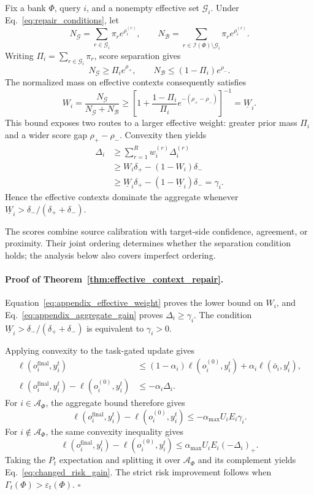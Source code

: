 Fix a bank $\Phi$, query $i$, and a nonempty effective set $\mathcal G_i$. Under
Eq.~\eqref{eq:repair_conditions}, let
\[
N_{\mathcal G}
=\sum_{r\in\mathcal G_i}\pi_r e^{\rho_i^{(r)}},
\qquad
N_{\mathcal B}
=\sum_{r\in\mathcal I(\Phi)\setminus\mathcal G_i}\pi_r e^{\rho_i^{(r)}}.
\]
Writing $\Pi_i=\sum_{r\in\mathcal G_i}\pi_r$, score separation gives
\[
N_{\mathcal G}\geq\Pi_i e^{\rho_+},
\qquad
N_{\mathcal B}\leq(1-\Pi_i)e^{\rho_-}.
\]
The normalized mass on effective contexts consequently satisfies
\begin{equation}
W_i
=\frac{N_{\mathcal G}}{N_{\mathcal G}+N_{\mathcal B}}
\geq
\left[1+\frac{1-\Pi_i}{\Pi_i}
e^{-(\rho_+-\rho_-)}\right]^{-1}
=\underline W_i.
\label{eq:appendix_effective_weight}
\end{equation}
This bound exposes two routes to a larger effective weight: greater prior
mass $\Pi_i$ and a wider score gap $\rho_+-\rho_-$.  Convexity then yields
\begin{equation}
\begin{aligned}
\Delta_i
&\geq\sum_{r=1}^{R} w_i^{(r)}\Delta_i^{(r)}\\
&\geq W_i\delta_+-(1-W_i)\delta_-\\
&\geq\underline W_i\delta_+-(1-\underline W_i)\delta_-
=\gamma_i.
\end{aligned}
\label{eq:appendix_aggregate_gain}
\end{equation}
Hence the effective contexts dominate the aggregate whenever
$\underline W_i>\delta_-/(\delta_++\delta_-)$.

The scores combine source calibration with target-side confidence, agreement,
or proximity.  Their joint ordering determines whether the separation
condition holds; the analysis below also covers imperfect ordering.

\paragraph{Proof of Theorem~\ref{thm:effective_context_repair}.}

Equation~\eqref{eq:appendix_effective_weight} proves the lower bound on
$W_i$, and Eq.~\eqref{eq:appendix_aggregate_gain} proves
$\Delta_i\geq\gamma_i$.  The condition
$\underline W_i>\delta_-/(\delta_++\delta_-)$ is equivalent to
$\gamma_i>0$.

Applying convexity to the task-gated update gives
\[
\begin{aligned}
\ell(o_i^{\mathrm{final}},y_i^t)
&\leq(1-\alpha_i)\ell(o_i^{(0)},y_i^t)
+\alpha_i\ell(\bar o_i,y_i^t),\\
\ell(o_i^{\mathrm{final}},y_i^t)-\ell(o_i^{(0)},y_i^t)
&\leq-\alpha_i\Delta_i.
\end{aligned}
\]
For $i\in\mathcal A_\Phi$, the aggregate bound therefore gives
\[
\ell(o_i^{\mathrm{final}},y_i^t)-\ell(o_i^{(0)},y_i^t)
\leq-\alpha_{\max}U_iE_i\gamma_i.
\]
For $i\notin\mathcal A_\Phi$, the same convexity inequality gives
\[
\ell(o_i^{\mathrm{final}},y_i^t)-\ell(o_i^{(0)},y_i^t)
\leq\alpha_{\max}U_iE_i(-\Delta_i)_+.
\]
Taking the $P_t$ expectation and splitting it over
$\mathcal A_\Phi$ and its complement yields
Eq.~\eqref{eq:changed_risk_gain}.  The strict risk improvement follows when
$\Gamma_t(\Phi)>\varepsilon_t(\Phi)$. \hfill$\square$

